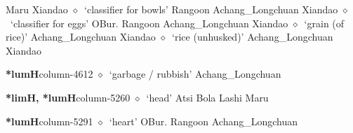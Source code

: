          Maru 
\hspace{1ex}
         Xiandao 
\hspace{1ex}
         $\diamond$~`classifier for bowls'
         Rangoon 
\hspace{1ex}
         Achang\_Longchuan 
\hspace{1ex}
         Xiandao 
\hspace{1ex}
         $\diamond$~`classifier for eggs'
         OBur. 
\hspace{1ex}
         Rangoon 
\hspace{1ex}
         Achang\_Longchuan 
\hspace{1ex}
         Xiandao 
\hspace{1ex}
         $\diamond$~`grain (of rice)'
         Achang\_Longchuan 
\hspace{1ex}
         Xiandao 
\hspace{1ex}
         $\diamond$~`rice (unhusked)'
         Achang\_Longchuan 
\hspace{1ex}
         Xiandao 
  \item {\footnotesize \textbf{*lumH}}{\tiny column-4612}
         $\diamond$~`garbage / rubbish'
         Achang\_Longchuan 
  \item {\footnotesize \textbf{*limH, *lumH}}{\tiny column-5260}
         $\diamond$~`head'
         Atsi 
\hspace{1ex}
         Bola 
\hspace{1ex}
         Lashi 
\hspace{1ex}
         Maru 
  \item {\footnotesize \textbf{*lumH}}{\tiny column-5291}
         $\diamond$~`heart'
         OBur. 
\hspace{1ex}
         Rangoon 
\hspace{1ex}
         Achang\_Longchuan 
